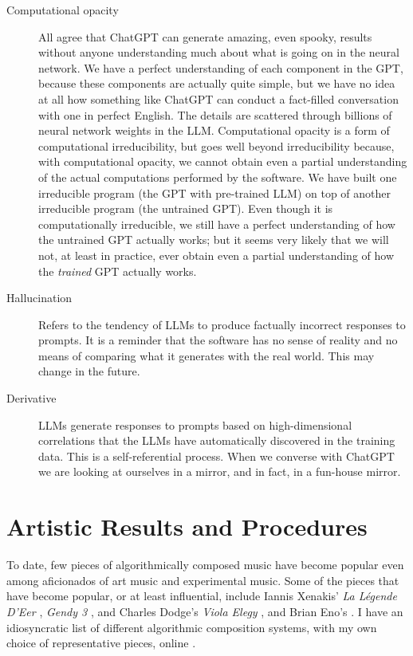 \documentclass[11pt]{amsart}
\begin{document}
\begin{description}
\item[Computational opacity] All agree that ChatGPT can generate amazing, even spooky, results without anyone understanding much about what is going on in the neural network. We have a perfect understanding of each component in the GPT, because these components are actually quite simple, but we have no idea at all how something like ChatGPT can conduct a fact-filled conversation with one in perfect English. The details are scattered through billions of neural network weights in the LLM. Computational opacity is a form of computational irreducibility, but goes well beyond irreducibility because, with computational opacity, we cannot obtain even a partial understanding of the actual computations performed by the software. We have built one irreducible program (the GPT with pre-trained LLM) on top of another irreducible program (the untrained GPT). Even though it is computationally irreducible, we still have a perfect understanding of how the untrained GPT actually works; but it seems very likely that we will not, at least in practice, ever obtain even a partial understanding of how the  \emph{trained} GPT actually works.
\item [Hallucination] Refers to the tendency of LLMs to produce factually incorrect responses to prompts. It is a reminder that the software has no sense of reality and no means of comparing what it generates with the real world. This may change in the future.
\item [Derivative] LLMs generate responses to prompts based on high-dimensional correlations that the LLMs have automatically discovered in the training data. This is a self-referential process. When we converse with ChatGPT we are looking at ourselves in a mirror, and in fact, in a fun-house mirror.
\end{description}

\section{Artistic Results and Procedures}

To date, few pieces of algorithmically composed music have become popular even among aficionados of art music and experimental music. Some of the pieces that have become popular, or at least influential, include Iannis Xenakis' \emph{La Légende D'Eer} \cite{Solr-8143160}, \emph{Gendy 3} \cite{gendy3}, and Charles Dodge's \emph{Viola Elegy} \cite{violaelegy}, and Brian Eno's \cite{eno1996generative, enochilvers}. I have an idiosyncratic list of different algorithmic composition systems, with my own choice of representative pieces, online \cite{rant}.
\end{document}
